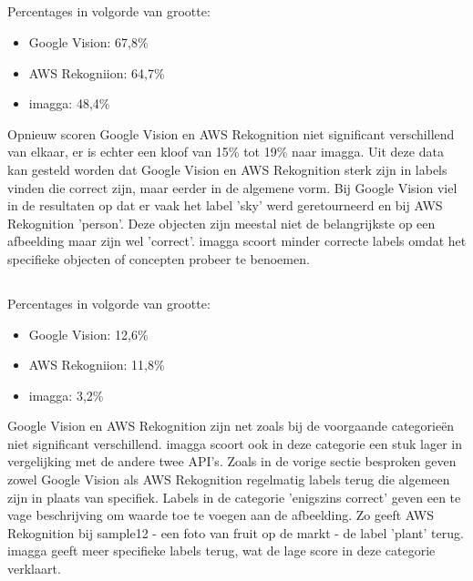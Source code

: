 \subsection{}
\label{sec:resultaten-correct}
Percentages in volgorde van grootte:
\begin{itemize}
    \item Google Vision: 67,8\%
    \item AWS Rekogniion: 64,7\%
    \item imagga: 48,4\%
\end{itemize}

Opnieuw scoren Google Vision en AWS Rekognition niet significant verschillend van elkaar, er is echter een kloof van 15\% tot 19\% naar imagga. Uit deze data kan gesteld worden dat Google Vision en AWS Rekognition sterk zijn in labels vinden die correct zijn, maar eerder in de algemene vorm. Bij Google Vision viel in de resultaten op dat er vaak het label 'sky' werd geretourneerd en bij AWS Rekognition 'person'. Deze objecten zijn meestal niet de belangrijkste op een afbeelding maar zijn wel 'correct'. imagga scoort minder correcte labels omdat het specifieke objecten of concepten probeer te benoemen.

\subsection{}
\label{sec:resultaten-enigszins-correct}
Percentages in volgorde van grootte:
\begin{itemize}
    \item Google Vision: 12,6\%
    \item AWS Rekogniion: 11,8\%
    \item imagga: 3,2\%
\end{itemize}

Google Vision en AWS Rekognition zijn net zoals bij de voorgaande categorieën niet significant verschillend. imagga scoort ook in deze categorie een stuk lager in vergelijking met de andere twee API's. Zoals in de vorige sectie besproken geven zowel Google Vision als AWS Rekognition regelmatig labels terug die algemeen zijn in plaats van specifiek. Labels in de categorie 'enigszins correct' geven een te vage beschrijving om waarde toe te voegen aan de afbeelding. Zo geeft AWS Rekognition bij sample12 - een foto van fruit op de markt - de label 'plant' terug. imagga geeft meer specifieke labels terug, wat de lage score in deze categorie verklaart.


